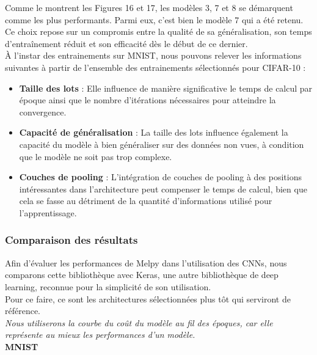 \begin{multicols}{2}
Comme le montrent les Figures 16 et 17, les modèles 3, 7 et 8 se démarquent comme 
les plus performants. Parmi eux, c'est bien le modèle 7 qui a été retenu. Ce choix repose sur un 
compromis entre la qualité de sa généralisation, son temps d’entraînement réduit et 
son efficacité dès le début de ce dernier. \\

À l'instar des entrainements sur MNIST, nous pouvons relever les informations suivantes à partir de l'ensemble des entrainements sélectionnés pour CIFAR-10 :  
\begin{itemize}
    \item \textbf{Taille des lots} : Elle influence de manière significative le temps de calcul par époque ainsi que le nombre d’itérations nécessaires pour atteindre 
    la convergence.
    \item \textbf{Capacité de généralisation} : La taille des lots influence également la capacité du modèle à bien généraliser sur des données non vues, à condition que le modèle ne soit pas trop complexe.
    \item \textbf{Couches de pooling} : L’intégration de couches de pooling à des positions intéressantes dans l’architecture peut compenser le temps de calcul, 
    bien que cela se fasse au détriment de la quantité d’informations utilisé pour l’apprentissage.
\end{itemize}
\hfill\break


\subsubsection{Comparaison des résultats}

Afin d’évaluer les performances de Melpy dans l’utilisation des CNNs, nous comparons cette bibliothèque avec Keras, une autre bibliothèque de deep learning, reconnue pour la simplicité de son utilisation. \\

Pour ce faire, ce sont les architectures sélectionnées plus tôt qui serviront de référence.\\

\textit{Nous utiliserons la courbe du coût du modèle au fil des époques, car elle représente au mieux les performances d’un modèle.} \\

\textbf{MNIST}


\end{multicols}
